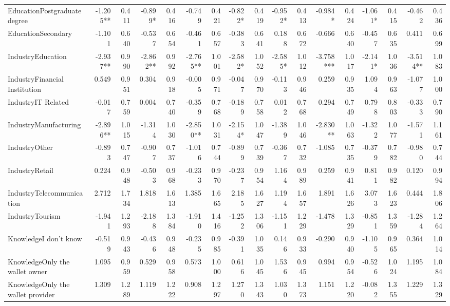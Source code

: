 \documentclass[twocolumn]{article}
\begin{document}
\begin{landscape}
\begin{table}[htbp]
{\begin{tabular}{@{}lrrrrrrrrrrrrrrrr@{}}
EducationPostgraduate degree & -1.205** & 0.411 & -0.899* & 0.416 & -0.749 & 0.421 & -0.822* & 0.419 & -0.952* & 0.413 & -0.984* & 0.424 & -1.061* & 0.415 & -0.462 & 0.436 \\
EducationSecondary & -1.101 & 0.640 & -0.537 & 0.654 & -0.461 & 0.657 & -0.383 & 0.641 & 0.188 & 0.672 & -0.666 & 0.640 & -0.457 & 0.635 & 0.411 & 0.699 \\
IndustryEducation & -2.937** & 0.990 & -2.862** & 0.992 & -2.765** & 1.001 & -2.582* & 1.052 & -2.585* & 1.012 & -3.758*** & 1.017 & -2.141* & 1.036 & -3.514** & 1.083 \\
IndustryFinancial Institution & 0.549 & 0.951 & 0.304 & 0.918 & -0.005 & 0.971 & -0.047 & 0.970 & -0.113 & 0.946 & 0.259 & 0.935 & 1.094 & 0.963 & -1.077 & 1.000 \\
IndustryIT Related & -0.017 & 0.759 & 0.004 & 0.740 & -0.359 & 0.768 & -0.189 & 0.758 & 0.012 & 0.768 & 0.294 & 0.749 & 0.798 & 0.803 & -0.333 & 0.790 \\
IndustryManufacturing & -2.896** & 1.015 & -1.314 & 1.030 & -2.850** & 1.031 & -2.154* & 1.047 & -1.389 & 1.046 & -2.830** & 1.063 & -1.322 & 1.077 & -1.571 & 1.161 \\
IndustryOther & -0.893 & 0.747 & -0.907 & 0.737 & -1.016 & 0.744 & -0.899 & 0.739 & -0.367 & 0.732 & -1.085 & 0.735 & -0.379 & 0.782 & -0.980 & 0.744 \\
IndustryRetail & 0.224 & 0.948 & -0.503 & 0.968 & -0.233 & 0.970 & -0.237 & 0.954 & 1.164 & 0.989 & 0.259 & 0.941 & 0.811 & 0.982 & 0.120 & 0.994 \\
IndustryTelecommunication & 2.712 & 1.734 & 1.818 & 1.613 & 1.385 & 1.665 & 2.185 & 1.627 & 1.194 & 1.657 & 1.891 & 1.626 & 3.073 & 1.623 & 0.444 & 1.806 \\
IndustryTourism & -1.941 & 1.293 & -2.188 & 1.384 & -1.910 & 1.416 & -1.252 & 1.306 & -1.151 & 1.229 & -1.478 & 1.329 & -0.851 & 1.359 & -1.284 & 1.264 \\
KnowledgeI don't know & -0.519 & 0.943 & -0.436 & 0.948 & -0.235 & 0.985 & -0.391 & 1.035 & 0.146 & 0.933 & -0.290 & 0.940 & -1.105 & 0.965 & 0.364 & 1.014 \\
KnowledgeOnly the wallet owner & 1.095 & 0.959 & 0.529 & 0.958 & 0.573 & 1.000 & 0.616 & 1.045 & 1.536 & 0.945 & 0.994 & 0.954 & -0.526 & 1.024 & 1.195 & 1.084 \\
KnowledgeOnly the wallet provider & 1.309 & 1.289 & 1.119 & 1.222 & 0.908 & 1.297 & 1.270 & 1.343 & 1.030 & 1.373 & 1.151 & 1.220 & -0.082 & 1.355 & 1.229 & 1.329 \\

\end{tabular}}
\end{table}
\end{landscape}
\end{document}
